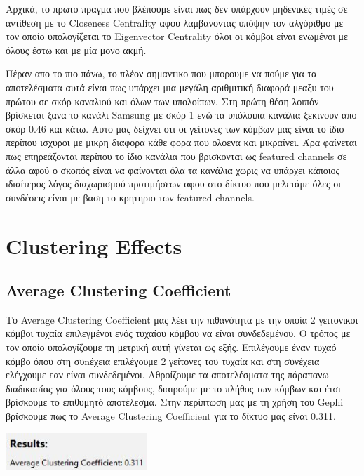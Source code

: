 \documentclass[12pt]{article}
\begin{document}
	\newpage
	Αρχικά, το πρωτο πραγμα που βλέπουμε είναι πως δεν υπάρχουν μηδενικές τιμές σε αντίθεση με το Closeness Centrality αφου λαμβανοντας υπόψην τον αλγόριθμο με τον οποίο υπολογίζεται το Eigenvector Centrality όλοι οι κόμβοι είναι ενωμένοι με όλους έστω και με μία μονο ακμή.
	\par
	Πέραν απο το πιο πάνω, το πλέον σημαντικο που μπορουμε να πούμε για τα αποτελέσματα αυτά είναι πως υπάρχει μια μεγάλη αριθμιτική διαφορά μεαξυ του πρώτου σε σκόρ καναλιού και όλων των υπολοίπων. Στη πρώτη θέση λοιπόν βρίσκεται ξανα το κανάλι Samsung με σκόρ 1 ενώ τα υπόλοιπα κανάλια ξεκινουν απο σκόρ 0.46 και κάτω. Αυτο μας δείχνει οτι οι γείτονες των κόμβων μας είναι το ίδιο περίπου ισχυροι με μικρη διαφορα κάθε φορα που ολοενα και μικραίνει. Άρα φαίνεται πως επηρεάζονται περίπου το ίδιο κανάλια που βρισκονται ως featured channels σε άλλα αφού ο σκοπός είναι να φαίνονται όλα τα κανάλια χωρις να υπάρχει κάποιος ιδιαίτερος λόγος διαχωρισμού προτιμήσεων αφου στο δίκτυο που μελετάμε όλες οι συνδέσεις είναι με βαση το κρητηριο των featured channels.
	\label{chap:centrality_measures_7}
	
	
	\newpage
	\section{Clustering Effects}
	\subsection{Average Clustering Coefficient}
	Το Average Clustering Coefficient μας λέει την πιθανότητα με την οποία 2 γειτονικοι κόμβοι τυχαία επιλεγμένοι ενός τυχαίου κόμβου να είναι συνδεδεμένου. Ο τρόπος με τον οποίο υπολογίζουμε τη μετρική αυτή γίνεται ως εξής. Επιλέγουμε έναν τυχαό κόμβο όπου στη συnέχεια επιλέγουμε 2 γείτονες του τυχαία και στη συνέχεια ελέγχουμε εαν είναι συνδεδεμένοι. Αθροίζουμε τα αποτελέσματα της πάραπανω διαδικασίας για όλους τους κόμβους, διαιρούμε με το πλήθος των κόμβων και έτσι βρίσκουμε το επιθυμητό αποτέλεσμα. Στην περίπτωση μας με τη χρήση του Gephi βρίσκουμε πως το Average Clustering Coefficient για το δίκτυο μας είναι 0.311.
	\begin{center}
		\includegraphics[width=0.4\textwidth]{photos-files/section8/average_clustering_coefficient.JPG}
	\end{center}
	
\end{document}
